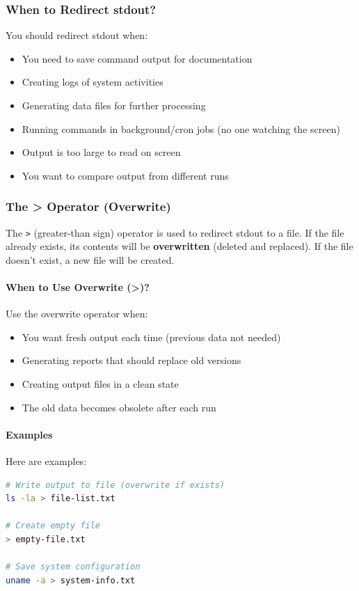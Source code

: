 \subsubsection{When to Redirect stdout?}

You should redirect stdout when:
\begin{itemize}
	\item You need to save command output for documentation
	\item Creating logs of system activities
	\item Generating data files for further processing
	\item Running commands in background/cron jobs (no one watching the screen)
	\item Output is too large to read on screen
	\item You want to compare output from different runs
\end{itemize}

\subsubsection{The > Operator (Overwrite)}

The \texttt{>} (greater-than sign) operator is used to redirect stdout to a file. If the file already exists, its contents will be \textbf{overwritten} (deleted and replaced). If the file doesn't exist, a new file will be created.

\paragraph{When to Use Overwrite (>)?}

Use the overwrite operator when:
\begin{itemize}
	\item You want fresh output each time (previous data not needed)
	\item Generating reports that should replace old versions
	\item Creating output files in a clean state
	\item The old data becomes obsolete after each run
\end{itemize}

\paragraph{Examples}

Here are examples:

\begin{lstlisting}[language=bash, caption={Redirecting stdout with overwrite}]
# Write output to file (overwrite if exists)
ls -la > file-list.txt

# Create empty file
> empty-file.txt

# Save system configuration
uname -a > system-info.txt
\end{lstlisting}

